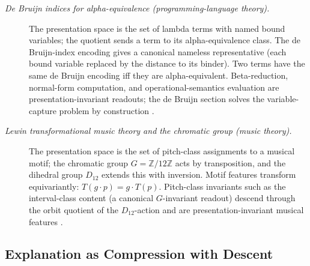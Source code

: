 \documentclass[11pt]{article}
\theoremstyle{definition}
\begin{document}
\begin{description}
\item[\emph{De Bruijn indices for alpha-equivalence
(programming-language theory).}]
The presentation space is the set of lambda terms with
named bound variables; the quotient sends a term to its
alpha-equivalence class.  The de Bruijn-index encoding
gives a canonical nameless representative (each bound
variable replaced by the distance to its binder).  Two
terms have the same de Bruijn encoding iff they are
alpha-equivalent.  Beta-reduction, normal-form
computation, and operational-semantics evaluation are
presentation-invariant readouts; the de Bruijn section
solves the variable-capture problem by construction
\citep{deBruijn1972LambdaNotation}.

\item[\emph{Lewin transformational music theory and the
chromatic group (music theory).}]
The presentation space is the set of pitch-class
assignments to a musical motif; the chromatic group
\(G=\mathbb Z/12\mathbb Z\) acts by transposition, and
the dihedral group \(D_{12}\) extends this with
inversion.  Motif features transform equivariantly:
\(T(g\cdot p)=g\cdot T(p)\).  Pitch-class invariants
such as the interval-class content (a canonical
\(G\)-invariant readout) descend through the orbit
quotient of the \(D_{12}\)-action and are
presentation-invariant musical features
\citep{Lewin1987GMIT}.
\end{description}

\subsection{Explanation as Compression with Descent}\label{sec:status-records-coherence:explanation}
\end{document}
